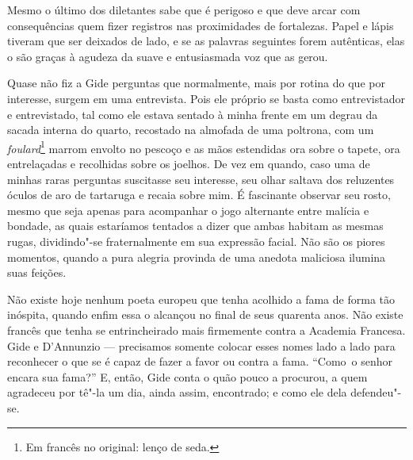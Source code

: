 Mesmo o último dos diletantes sabe que é perigoso e que deve arcar com consequências
quem fizer
registros nas proximidades de fortalezas. Papel e lápis tiveram que ser
deixados de lado, e se as palavras seguintes forem autênticas, elas o são
graças à agudeza da suave e entusiasmada voz que as gerou.

Quase não fiz a Gide perguntas que normalmente, mais por rotina do que
por interesse, surgem em uma entrevista. Pois ele próprio se basta como entrevistador e entrevistado, tal como ele estava
sentado à minha frente em um degrau da sacada interna do quarto,
recostado na almofada de uma poltrona, com um \emph{foulard}\footnote{Em francês no original: lenço de seda. \versal{[N.~T.]}} marrom envolto no pescoço e as mãos estendidas ora
sobre o tapete, ora entrelaçadas e recolhidas sobre os joelhos.
De vez em
quando, caso uma de minhas raras perguntas suscitasse seu interesse, seu
olhar saltava dos reluzentes óculos de aro de tartaruga e recaia sobre
mim. É fascinante observar seu rosto, mesmo que seja apenas para
acompanhar o jogo alternante entre malícia e bondade, as quais
estaríamos tentados a dizer que ambas habitam as mesmas rugas,
dividindo"-se fraternalmente em sua expressão facial. Não são os piores
momentos, quando a pura alegria provinda de uma anedota maliciosa
ilumina suas feições.

Não existe hoje nenhum poeta europeu que tenha acolhido a fama de forma
tão inóspita, quando enfim essa o alcançou no final de seus quarenta anos.
Não existe francês que tenha se entrincheirado mais firmemente contra a
Academia Francesa. Gide e D'Annunzio --- precisamos somente colocar esses
nomes lado a lado para reconhecer o que se é capaz de fazer a favor ou
contra a fama. ``Como~o senhor encara sua fama?'' E, então, Gide conta o
quão pouco a procurou, a quem agradeceu por tê"-la um dia, ainda assim,
encontrado; e como ele dela defendeu"-se.

